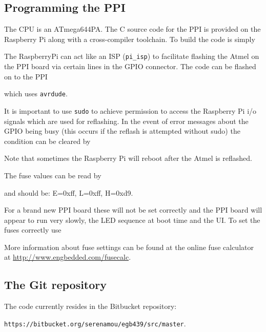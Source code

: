 \documentclass[11pt,fleqn]{article}
\begin{document}
\subsection{Programming the PPI}
The CPU is an ATmega644PA.
The C source code for the PPI is provided on the Raspberry Pi along with a cross-compiler toolchain.  To build the code is simply
\begin{Code}
\end{Code}

The RaspberryPi can act like an ISP (\texttt{pi\_isp}) to facilitate flashing the Atmel on the PPI board via certain lines in the GPIO connector.
The code can be flashed on to the PPI 
\begin{Code}
\end{Code}
which uses \texttt{avrdude}.

It is important to use \texttt{sudo} to achieve permission to access the Raspberry Pi i/o signals which are used for reflashing.
In the event of error messages about the GPIO being busy (this occurs if the reflash is attempted without sudo) the condition can be cleared by
\begin{Code}
\end{Code}
Note that sometimes the Raspberry Pi will reboot after the Atmel is reflashed.

The fuse values can be read by
\begin{Code}
\end{Code}
and should be: E=0xff, L=0xff, H=0xd9. 

For a brand new PPI board these will not be set correctly and the PPI board will appear to run very slowly, the LED sequence at boot time and the UI.  To set the fuses correctly use
\begin{Code}
\end{Code}



More information about fuse settings can be found at the online fuse calculator at \url{http://www.engbedded.com/fusecalc}.

\subsection{The Git repository}
The code currently resides in the Bitbucket repository:

\texttt{https://bitbucket.org/serenamou/egb439/src/master}.
\end{document}
